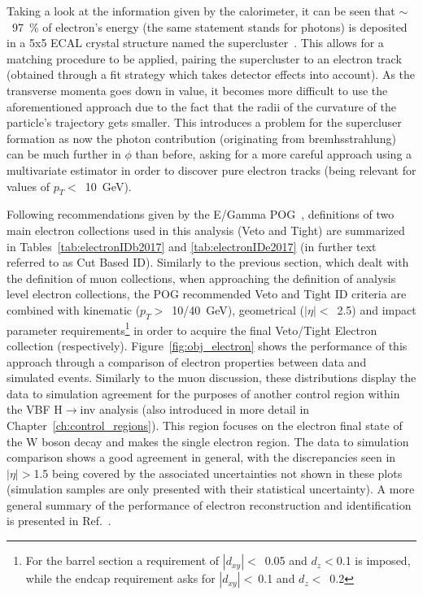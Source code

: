 \hspace{10pt} Taking a look at the information given by the calorimeter, it can be seen that $\sim$~97~\% of electron's energy (the same statement stands for photons) is deposited in a 5x5 ECAL crystal structure named the supercluster~\cite{twiki_ecal_clustering}. This allows for a matching procedure to be applied, pairing the supercluster to an electron track (obtained through a fit strategy which takes detector effects into account). As the transverse momenta goes down in value, it becomes more difficult to use the aforementioned approach due to the fact that the radii of the curvature of the particle's trajectory gets smaller. This introduces a problem for the supercluser formation as now the photon contribution (originating from bremhsstrahlung) can be much further in $\phi$ than before, asking for a more careful approach using a multivariate estimator in order to discover pure electron tracks (being relevant for values of $p_T<$~10~GeV).

\hspace{10pt} Following recommendations given by the E/Gamma POG~\cite{twiki_egamma_1,twiki_egamma_2}, definitions of two main electron collections used in this analysis (Veto and Tight) are summarized in Tables~\ref{tab:electronIDb2017} and \ref{tab:electronIDe2017} (in further text referred to as Cut Based ID). Similarly to the previous section, which dealt with the definition of muon collections, when approaching the definition of analysis level electron collections, the POG recommended Veto and Tight ID criteria are combined with kinematic ($p_T>$~10/40~GeV), geometrical ($|\eta|<$~2.5) and impact parameter requirements\footnote{For the barrel section a requirement of $|d_{xy}|<$~0.05 and $d_z<$0.1 is imposed, while the endcap requirement asks for $|d_{xy}|<~$0.1 and $d_z<$~0.2} in order to acquire the final Veto/Tight Electron collection (respectively). Figure~\ref{fig:obj_electron} shows the performance of this approach through a comparison of electron properties between data and simulated events. Similarly to the muon discussion, these distributions display the data to simulation agreement for the purposes of another control region within the VBF H$\rightarrow$inv analysis (also introduced in more detail in Chapter~\ref{ch:control_regions}). This region focuses on the electron final state of the W boson decay and makes the single electron region. The data to simulation comparison shows a good agreement in general, with the discrepancies seen in $|\eta|>$1.5 being covered by the associated uncertainties not shown in these plots (simulation samples are only presented with their statistical uncertainty). A more general summary of the performance of electron reconstruction and identification is presented in Ref.~\cite{dps:ele_perf}.

